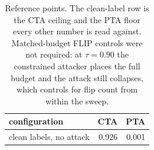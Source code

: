 \begin{table}[t]
\centering
\small
\begin{tabular}{lrr}
\toprule
configuration & CTA & PTA \\
\midrule
clean labels, no attack & 0.926 & 0.001 \\
\bottomrule
\end{tabular}
\caption{Reference points. The clean-label row is the CTA ceiling and the PTA floor every other number is read against. Matched-budget FLIP controls were not required: at $\tau = 0.90$ the constrained attacker places the full budget and the attack still collapses, which controls for flip count from within the sweep.}
\label{tab:controls}
\end{table}
